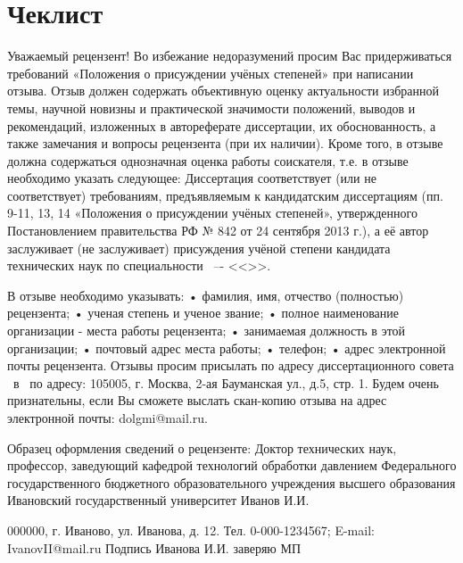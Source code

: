 

\section{Чеклист}


Уважаемый рецензент!
Во избежание недоразумений просим Вас придерживаться требований «Положения о присуждении учёных степеней» при написании отзыва.
Отзыв должен содержать объективную оценку актуальности избранной темы, научной новизны и практической значимости положений, выводов и рекомендаций, изложенных в автореферате диссертации, их обоснованность, а также замечания и вопросы рецензента (при их наличии). Кроме того, в отзыве должна содержаться однозначная оценка работы соискателя, т.е. в отзыве необходимо указать следующее:
Диссертация соответствует (или не соответствует) требованиям, предъявляемым к кандидатским диссертациям (пп. 9-11, 13, 14 «Положения о присуждении учёных степеней», утвержденного Постановлением правительства РФ № 842 от 24 сентября 2013 г.), а её автор заслуживает (не заслуживает) присуждения учёной степени кандидата технических наук по специальности \thesisSpecialtyNumber\ –- <<\thesisSpecialtyTitle>>.

В отзыве необходимо указывать:
•	фамилия, имя, отчество (полностью) рецензента;
•	ученая степень и ученое звание;
•	полное наименование организации - места работы рецензента;
•	занимаемая должность в этой организации;
•	почтовый адрес места работы;
•	телефон;
•	адрес электронной почты рецензента.
Отзывы просим присылать по адресу диссертационного совета \ в \thesisInOrganization\ по адресу: 105005, г. Москва, 2-ая Бауманская ул., д.5, стр. 1.
Будем очень признательны, если Вы сможете выслать скан-копию отзыва на адрес электронной почты: dolgmi@mail.ru.


Образец оформления сведений о рецензенте:
Доктор технических наук, профессор, заведующий кафедрой технологий обработки давлением Федерального государственного бюджетного образовательного
учреждения высшего образования 
Ивановский государственный университет						Иванов И.И.

000000, г. Иваново, ул. Иванова, д. 12.
Тел. 0-000-1234567; E-mail: IvanovII@mail.ru
Подпись Иванова И.И. заверяю
МП
\clearpage